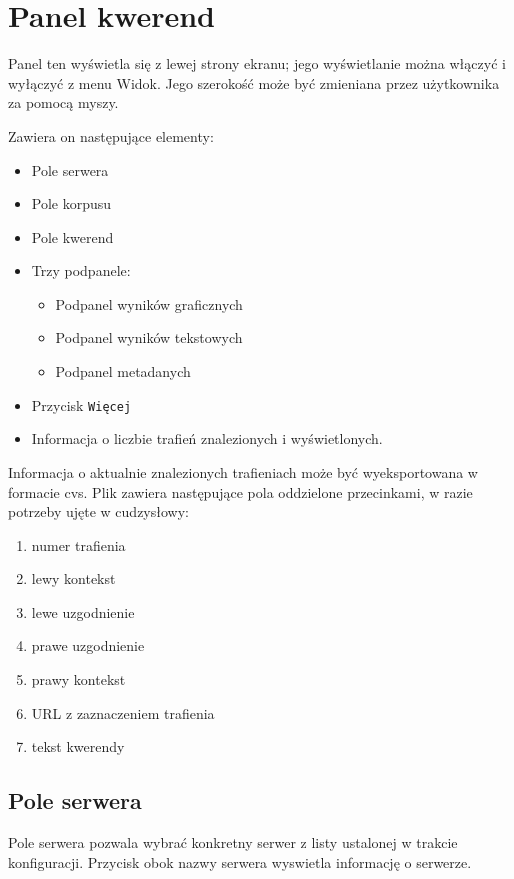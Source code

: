 \documentclass{mwart}
\begin{document}
\section{Panel kwerend}
\label{sec:panel-kwerend}

Panel ten wyświetla się z lewej strony ekranu; jego wyświetlanie można
włączyć i wyłączyć z menu \textsf{Widok}. Jego szerokość może być
zmieniana przez użytkownika za pomocą myszy.

Zawiera on następujące elementy:
\begin{itemize}
\item Pole serwera
\item Pole korpusu
\item Pole kwerend
\item Trzy podpanele:
  \begin{itemize}
  \item Podpanel wyników graficznych
  \item Podpanel wyników tekstowych
  \item Podpanel metadanych
  \end{itemize}
\item Przycisk \texttt{Więcej}
\item Informacja o liczbie trafień znalezionych i wyświetlonych.
\end{itemize}

Informacja o aktualnie znalezionych trafieniach może być
wyeksportowana w formacie cvs. Plik zawiera następujące pola
oddzielone przecinkami, w razie potrzeby ujęte w cudzysłowy:
\begin{enumerate}
\item numer trafienia
\item lewy kontekst
\item lewe uzgodnienie
\item prawe uzgodnienie
\item prawy kontekst
\item URL z zaznaczeniem trafienia
\item tekst kwerendy
\end{enumerate}

\subsection{Pole serwera}
\label{sec:pole-serwera}

Pole serwera pozwala wybrać konkretny serwer z listy ustalonej w
trakcie konfiguracji. Przycisk obok nazwy serwera wyswietla informację
o serwerze.
\end{document}
